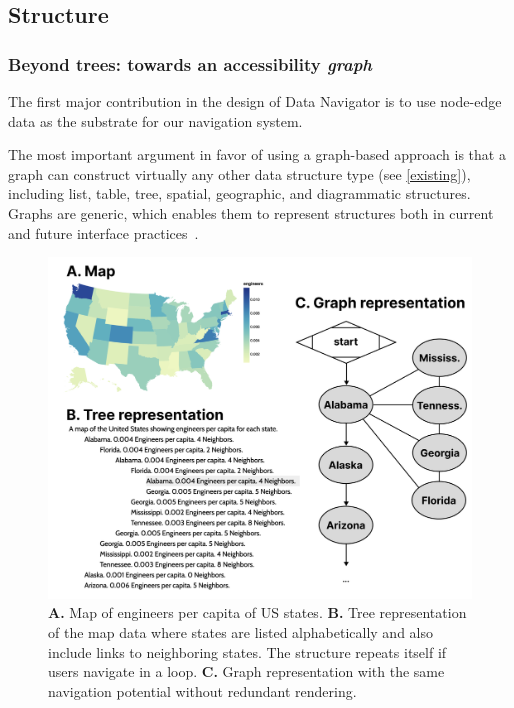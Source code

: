 \documentclass[journal]{vgtc}                %
\begin{document}
\subsection{Structure}
\subsubsection{Beyond trees: towards an accessibility \textit{graph}}

The first major contribution in the design of Data Navigator is to use node-edge data as the substrate for our navigation system.

The most important argument in favor of using a graph-based approach is that a graph can construct virtually any other data structure type (see \autoref{existing}), including list, table, tree, spatial, geographic, and diagrammatic structures. Graphs are generic, which enables them to represent structures both in current and future interface practices~\cite{Gansner2000Open}.

\begin{figure}[h]
  \centering
  \includegraphics[width=\linewidth]{figures/geoviz.png}
  \caption{\textbf{A.} Map of engineers per capita of US states. \textbf{B.} Tree representation of the map data where states are listed alphabetically and also include links to neighboring states. The structure repeats itself if users navigate in a loop. \textbf{C.} Graph representation with the same navigation potential without redundant rendering.}
  \label{map}
\end{figure}
\end{document}

